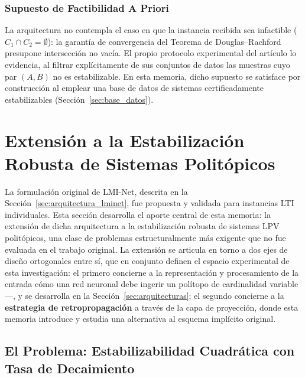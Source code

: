 \subsubsection{Supuesto de Factibilidad A Priori}
La arquitectura no contempla el caso en que la instancia recibida sea infactible 
($C_1 \cap C_2 = \emptyset$): la garantía de convergencia del Teorema de 
Douglas--Rachford presupone intersección no vacía. El propio protocolo experimental 
del artículo lo evidencia, al filtrar explícitamente de sus conjuntos de datos las 
muestras cuyo par $(A, B)$ no es estabilizable. En esta memoria, dicho supuesto se 
satisface por construcción al emplear una base de datos de sistemas certificadamente 
estabilizables (Sección~\ref{sec:base_datos}).




\section{Extensión a la Estabilización Robusta de Sistemas Politópicos}
\label{sec:extension_lpv}

La formulación original de LMI-Net, descrita en la 
Sección~\ref{sec:arquitectura_lminet}, fue propuesta y validada para instancias LTI 
individuales. Esta sección desarrolla el aporte central de esta memoria: la extensión 
de dicha arquitectura a la estabilización robusta de sistemas LPV politópicos, una 
clase de problemas estructuralmente más exigente que no fue evaluada en el trabajo 
original. La extensión se articula en torno a dos ejes de diseño ortogonales entre sí, 
que en conjunto definen el espacio experimental de esta investigación: el primero 
concierne a la representación y procesamiento de la entrada cómo una red 
neuronal debe ingerir un polítopo de cardinalidad variable---, y se desarrolla en la 
Sección~\ref{sec:arquitecturas}; el segundo concierne a la \textbf{estrategia de 
retropropagación} a través de la capa de proyección, donde esta memoria introduce y 
estudia una alternativa al esquema implícito original.

\subsection{El Problema: Estabilizabilidad Cuadrática con Tasa de Decaimiento}
\label{subsec:problema_politopico}

